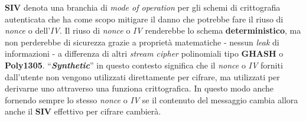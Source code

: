 \begin{flushleft}
    \textbf{SIV} denota una branchia di \textit{mode of operation} per gli schemi di crittografia autenticata che ha come scopo mitigare il danno che potrebbe fare il riuso di \textit{nonce} o dell'\textit{IV}. Il riuso di \textit{nonce} o \textit{IV} renderebbe lo schema \textbf{deterministico}, ma non perderebbe di sicurezza grazie a proprietà matematiche - nessun \textit{leak} di informazioni - a differenza di altri \textit{stream cipher} polinomiali tipo \textbf{GHASH} o \textbf{Poly1305}. ``\textbf{\textit{Synthetic}}'' in questo contesto significa che il \textit{nonce} o \textit{IV} forniti dall'utente non vengono utilizzati direttamente per cifrare, ma utilizzati per derivarne uno attraverso una funziona crittografica. In questo modo anche fornendo sempre lo stesso \textit{nonce} o \textit{IV} se il contenuto del messaggio cambia allora anche il \textbf{SIV} effettivo per cifrare cambierà.


\end{flushleft}

